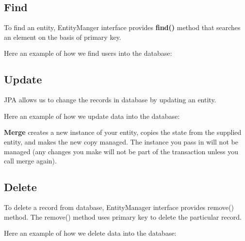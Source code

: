 \documentclass[a4paper]{article}
\begin{document}
\subsection{Find}
To find an entity, EntityManger interface provides \textbf{find()} method that searches an element on the basis of primary key.

Here an example of how we find users into the database:


\subsection{Update}
JPA allows us to change the records in database by updating an entity.

Here an example of how we update data into the database:

\textbf{Merge} creates a new instance of your entity, copies the state from the supplied entity, and makes the new copy managed. The instance you pass in will not be managed (any changes you make will not be part of the transaction unless you call merge again).

\subsection{Delete}
To delete a record from database, EntityManager interface provides remove() method. The remove() method uses primary key to delete the particular record.

Here an example of how we delete data into the database:

\end{document}
